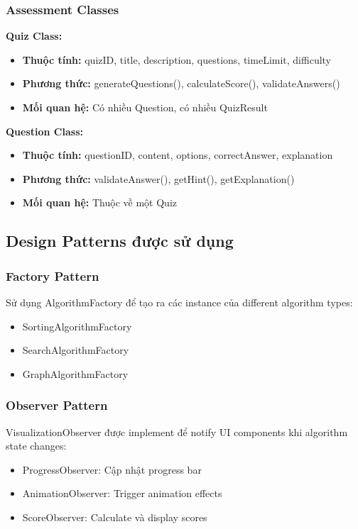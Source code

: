 \subsubsection{Assessment Classes}

\textbf{Quiz Class:}
\begin{itemize}
    \item \textbf{Thuộc tính:} quizID, title, description, questions, timeLimit, difficulty
    \item \textbf{Phương thức:} generateQuestions(), calculateScore(), validateAnswers()
    \item \textbf{Mối quan hệ:} Có nhiều Question, có nhiều QuizResult
\end{itemize}

\textbf{Question Class:}
\begin{itemize}
    \item \textbf{Thuộc tính:} questionID, content, options, correctAnswer, explanation
    \item \textbf{Phương thức:} validateAnswer(), getHint(), getExplanation()
    \item \textbf{Mối quan hệ:} Thuộc về một Quiz
\end{itemize}

\subsection{Design Patterns được sử dụng}

\subsubsection{Factory Pattern}
Sử dụng AlgorithmFactory để tạo ra các instance của different algorithm types:
\begin{itemize}
    \item SortingAlgorithmFactory
    \item SearchAlgorithmFactory  
    \item GraphAlgorithmFactory
\end{itemize}

\subsubsection{Observer Pattern}
VisualizationObserver được implement để notify UI components khi algorithm state changes:
\begin{itemize}
    \item ProgressObserver: Cập nhật progress bar
    \item AnimationObserver: Trigger animation effects
    \item ScoreObserver: Calculate và display scores
\end{itemize}

